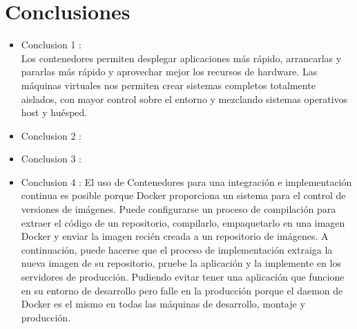 \documentclass[preprint,12pt]{elsarticle}
\begin{document}
\section{Conclusiones}

\begin{itemize}

\item Conclusion 1 : \\ Los contenedores permiten desplegar aplicaciones más rápido, arrancarlas y pararlas más rápido y aprovechar mejor los recursos de hardware. Las máquinas virtuales nos permiten crear sistemas completos totalmente aislados, con mayor control sobre el entorno y mezclando sistemas operativos host y huésped. 

\item Conclusion 2 : \\ 

\item Conclusion 3 : \\ 

\item Conclusion 4 :
El uso de  Contenedores para una integración e implementación continua es posible porque Docker proporciona un sistema para el control de versiones de imágenes. Puede configurarse un proceso de compilación para extraer el código de un repositorio, compilarlo, empaquetarlo en una imagen Docker y enviar la imagen recién creada a un repositorio de imágenes. A continuación, puede hacerse que el proceso de implementación extraiga la nueva imagen de su repositorio, pruebe la aplicación y la implemente en los servidores de producción. Pudiendo evitar tener una aplicación que funcione en su entorno de desarrollo pero falle en la producción porque el daemon de Docker es el mismo en todas las máquinas de desarrollo, montaje y producción.
\end{itemize}


	
	\newpage
	
		 
	
	
\end{document}

